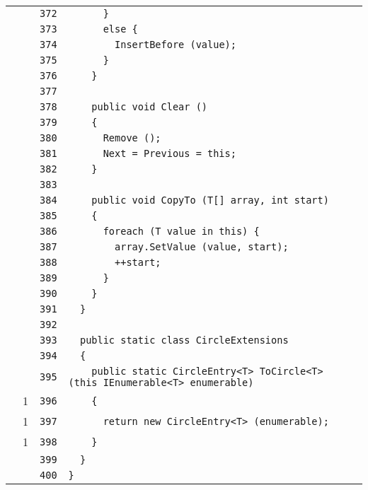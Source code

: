 \documentclass[a4paper,10pt]{article}
\begin{document}
\begin{longtable}[l]{lrrl}
\cellcolor{gray} &  & \verb~372~ & \verb~      }~\\
\cellcolor{gray} &  & \verb~373~ & \verb~      else {~\\
\cellcolor{gray} &  & \verb~374~ & \verb~        InsertBefore (value);~\\
\cellcolor{gray} &  & \verb~375~ & \verb~      }~\\
\cellcolor{gray} &  & \verb~376~ & \verb~    }~\\
\cellcolor{gray} &  & \verb~377~ & \verb~~\\
\cellcolor{gray} &  & \verb~378~ & \verb~    public void Clear ()~\\
\cellcolor{gray} &  & \verb~379~ & \verb~    {~\\
\cellcolor{gray} &  & \verb~380~ & \verb~      Remove ();~\\
\cellcolor{gray} &  & \verb~381~ & \verb~      Next = Previous = this;~\\
\cellcolor{gray} &  & \verb~382~ & \verb~    }~\\
\cellcolor{gray} &  & \verb~383~ & \verb~~\\
\cellcolor{gray} &  & \verb~384~ & \verb~    public void CopyTo (T[] array, int start)~\\
\cellcolor{gray} &  & \verb~385~ & \verb~    {~\\
\cellcolor{gray} &  & \verb~386~ & \verb~      foreach (T value in this) {~\\
\cellcolor{gray} &  & \verb~387~ & \verb~        array.SetValue (value, start);~\\
\cellcolor{gray} &  & \verb~388~ & \verb~        ++start;~\\
\cellcolor{gray} &  & \verb~389~ & \verb~      }~\\
\cellcolor{gray} &  & \verb~390~ & \verb~    }~\\
\cellcolor{gray} &  & \verb~391~ & \verb~  }~\\
\cellcolor{gray} &  & \verb~392~ & \verb~~\\
\cellcolor{gray} &  & \verb~393~ & \verb~  public static class CircleExtensions~\\
\cellcolor{gray} &  & \verb~394~ & \verb~  {~\\
\cellcolor{gray} &  & \verb~395~ & \verb~    public static CircleEntry<T> ToCircle<T> (this IEnumerable<T> enumerable)~\\
\cellcolor{green} & 1 & \verb~396~ & \verb~    {~\\
\cellcolor{green} & 1 & \verb~397~ & \verb~      return new CircleEntry<T> (enumerable);~\\
\cellcolor{green} & 1 & \verb~398~ & \verb~    }~\\
\cellcolor{gray} &  & \verb~399~ & \verb~  }~\\
\cellcolor{gray} &  & \verb~400~ & \verb~}~\\
\end{longtable}
\newpage
\end{document}
